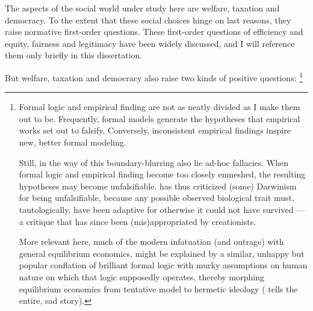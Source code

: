 The aspects of the social world under study here are welfare, taxation and democracy.
To the extent that these social choices hinge on last reasons, they raise normative first-order questions.
These first-order questions of efficiency and equity, fairness and legitimacy have been widely discussed, and I will reference them only briefly in this dissertation.

But welfare, taxation and democracy also raise two kinds of positive questions:
\footnote{
	Formal logic and empirical finding are not as neatly divided as I make them out to be.
	Frequently, formal models generate the hypotheses that empirical works set out to falsify.
	Conversely, inconsistent empirical findings inspire new, better formal modeling.

	Still, in the way of this boundary-blurring also lie ad-hoc fallacies.
	When formal logic and empirical finding become too closely enmeshed, the resulting hypotheses may become unfalsifiable.
	\cite{Popper1976} has thus criticized (some) Darwinism for being unfalsifiable, because any possible observed biological trait must, tautologically, have been adaptive for otherwise it could not have survived --- a critique that has since been (mis)appropriated by creationists.

	More relevant here, much of the modern infatuation (and outrage) with general equilibrium economics, might be explained by a similar, unhappy but popular conflation of brilliant formal logic \citep{Walras1874,Debreu1954} with murky assumptions on human nature on which that logic supposedly operates, thereby morphing equilibrium economics from tentative model to hermetic ideology (\citealt{Cassidy2010} tells the entire, sad story).
}

